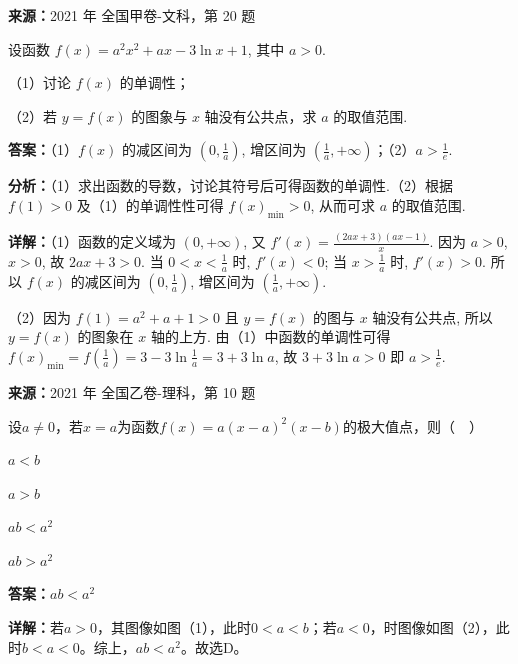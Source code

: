 \begin{question}[points=12]
\textbf{来源：}2021 年 全国甲卷-文科，第 20 题\par
设函数 $f(x) = a^2 x^2 + ax - 3\ln x + 1$, 其中 $a>0$.



（1）讨论 $f(x)$ 的单调性；



（2）若 $y=f(x)$ 的图象与 $x$ 轴没有公共点，求 $a$ 的取值范围.
\begin{solution}
\textbf{答案：}（1）$f(x)$ 的减区间为 $\left(0, \frac{1}{a}\right)$, 增区间为 $\left(\frac{1}{a}, +\infty\right)$；（2）$a > \frac{1}{e}$.

\textbf{分析：}（1）求出函数的导数，讨论其符号后可得函数的单调性.（2）根据 $f(1)>0$ 及（1）的单调性性可得 $f(x)_{\min} > 0$, 从而可求 $a$ 的取值范围.

\textbf{详解：}（1）函数的定义域为 $(0, +\infty)$, 又 $f'(x) = \frac{(2ax+3)(ax-1)}{x}$. 因为 $a>0$, $x>0$, 故 $2ax+3>0$. 当 $0 < x < \frac{1}{a}$ 时, $f'(x) < 0$; 当 $x > \frac{1}{a}$ 时, $f'(x) > 0$. 所以 $f(x)$ 的减区间为 $\left(0, \frac{1}{a}\right)$, 增区间为 $\left(\frac{1}{a}, +\infty\right)$.

（2）因为 $f(1)=a^2+a+1>0$ 且 $y=f(x)$ 的图与 $x$ 轴没有公共点, 所以 $y=f(x)$ 的图象在 $x$ 轴的上方. 由（1）中函数的单调性可得 $f(x)_{\min} = f\left(\frac{1}{a}\right) = 3 - 3\ln\frac{1}{a} = 3 + 3\ln a$, 故 $3+3\ln a > 0$ 即 $a > \frac{1}{e}$.
\end{solution}
\end{question}

\begin{question}[points=5]
\textbf{来源：}2021 年 全国乙卷-理科，第 10 题\par
设$a\neq0$，若$x=a$为函数$f(x)=a(x-a)^2(x-b)$的极大值点，则（  ）
\begin{choices}
  \item $a<b$
  \item $a>b$
  \item $ab<a^2$
  \item $ab>a^2$
\end{choices}
\begin{solution}
\textbf{答案：}$ab<a^2$

\textbf{详解：}若$a>0$，其图像如图（1），此时$0<a<b$；若$a<0$，时图像如图（2），此时$b<a<0$。综上，$ab<a^2$。故选D。
\end{solution}
\end{question}

